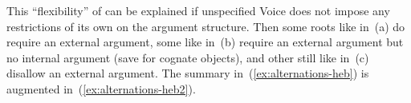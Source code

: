 
This ``flexibility'' of {\tkal} can be explained if unspecified Voice does not impose any restrictions of its own on the argument structure. Then some roots like  in~(\lastx a) do require an external argument, some like  in~(\lastx b) require an external argument but no internal argument (save for cognate objects), and other still like  in~(\lastx c) disallow an external argument. The summary in~(\ref{ex:alternations-heb}) is augmented in~(\ref{ex:alternations-heb2}).
\ex\label{ex:alternations-heb2}
\xe


